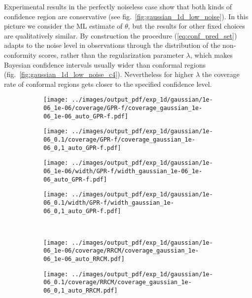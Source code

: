 \documentclass[10pt, conference, compsocconf]{IEEEtran}
\begin{document}
Experimental results in the perfectly noiseless case show that both kinds of confidence
region are conservative (see fig.~\ref{fig:gaussian_1d_low_noise}). In this picture we
consider the ML estimate of $\theta$, but the results for other fixed choices are qualitatively
similar. By construction the procedure (\ref{eq:conf_pred_set}) adapts to the noise
level in observations through the distribution of the non-conformity scores, rather
than the regularization parameter $\lambda$, which makes Bayesian confidence intervals
usually wider than conformal regions (fig.~\ref{fig:gaussian_1d_low_noise_c4}). Nevertheless
for higher $\lambda$ the coverage rate of conformal regions gets closer to the specified
confidence level.

\begin{figure}%
  \centering
  \begin{subfigure}[b]{0.25\linewidth}
    \texttt{[image: ../images/output\_pdf/exp\_1d/gaussian/1e-06\_1e-06/coverage/GPR-f/coverage\_gaussian\_1e-06\_1e-06\_auto\_GPR-f.pdf]}
  \end{subfigure}%
  \begin{subfigure}[b]{0.25\linewidth}
    \texttt{[image: ../images/output\_pdf/exp\_1d/gaussian/1e-06\_0.1/coverage/GPR-f/coverage\_gaussian\_1e-06\_0,1\_auto\_GPR-f.pdf]}
  \end{subfigure}%
  \begin{subfigure}[b]{0.25\linewidth}
    \texttt{[image: ../images/output\_pdf/exp\_1d/gaussian/1e-06\_1e-06/width/GPR-f/width\_gaussian\_1e-06\_1e-06\_auto\_GPR-f.pdf]}
  \end{subfigure}%
  \begin{subfigure}[b]{0.25\linewidth}
    \texttt{[image: ../images/output\_pdf/exp\_1d/gaussian/1e-06\_0.1/width/GPR-f/width\_gaussian\_1e-06\_0,1\_auto\_GPR-f.pdf]}
  \end{subfigure}\\
  \begin{subfigure}[b]{0.25\linewidth}
    \texttt{[image: ../images/output\_pdf/exp\_1d/gaussian/1e-06\_1e-06/coverage/RRCM/coverage\_gaussian\_1e-06\_1e-06\_auto\_RRCM.pdf]}
  \end{subfigure}%
  \begin{subfigure}[b]{0.25\linewidth}
    \texttt{[image: ../images/output\_pdf/exp\_1d/gaussian/1e-06\_0.1/coverage/RRCM/coverage\_gaussian\_1e-06\_0,1\_auto\_RRCM.pdf]}
  \end{subfigure}%

\end{figure}
\end{document}

